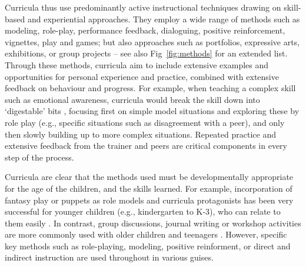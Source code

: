 \documentclass[prodmode,acmtochi]{acmsmall}
\begin{document}

  

Curricula thus use predominantly active instructional techniques drawing on skill-based and experiential approaches. They employ a wide range of methods such as modeling, role-play, performance feedback, dialoguing, positive reinforcement, vignettes, play and games; but also approaches such as portfolios, expressive arts, exhibitions, or group projects -- see also Fig~\ref{fig:methods} for an extended list. Through these methods, curricula aim to include extensive examples and opportunities for personal experience and practice, combined with extensive feedback on behaviour and progress. For example, when teaching a complex skill such as emotional awareness, curricula would break the skill down into `digestable' bits , focusing first on simple model situations and exploring these by role play (e.g., specific situations such as disagreement with a peer),  and only then slowly building up to more complex situations. Repeated practice and extensive feedback from the trainer and peers are critical components in every step of the process. 

Curricula are clear that the methods used must be developmentally appropriate for the age of the children, and the skills learned. For example, incorporation of fantasy play or puppets as role models and curricula protagonists has been very successful for younger children (e.g., kindergarten to K-3), who can relate to them easily  \cite{Webster-Stratton2004}. In contrast, group discussions, journal writing or workshop activities are more commonly used with older children and teenagers \cite{dejong1994}. However, specific key methods such as role-playing, modeling, positive reinforment, or direct and indirect instruction are used throughout in various guises. 
\end{document}
